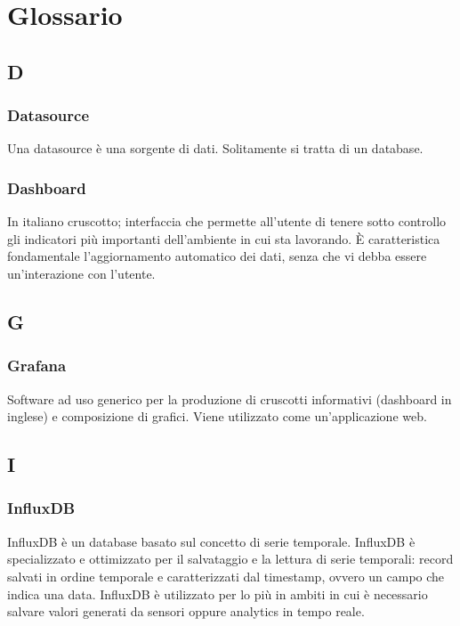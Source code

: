 \section{Glossario}


\subsection*{D}
\subsubsection*{Datasource}
Una datasource è una sorgente di dati. Solitamente si tratta di un database.

\subsubsection*{Dashboard}
In italiano cruscotto; interfaccia che permette all'utente di tenere sotto controllo gli indicatori più importanti dell'ambiente in cui sta lavorando. È caratteristica fondamentale l'aggiornamento automatico dei dati, senza che vi debba essere un'interazione con l'utente.

\subsection*{G}
\subsubsection*{Grafana}
Software ad uso generico per la produzione di cruscotti informativi (dashboard in inglese) e composizione di grafici. Viene utilizzato come un'applicazione web.

\subsection*{I}
\subsubsection*{InfluxDB}
InfluxDB è un database basato sul concetto di serie temporale. InfluxDB è specializzato e
ottimizzato per il salvataggio e la lettura di serie temporali: record salvati in ordine temporale
e caratterizzati dal timestamp, ovvero un campo che indica una data. InfluxDB è utilizzato
per lo più in ambiti in cui è necessario salvare valori generati da sensori oppure analytics in
tempo reale.

